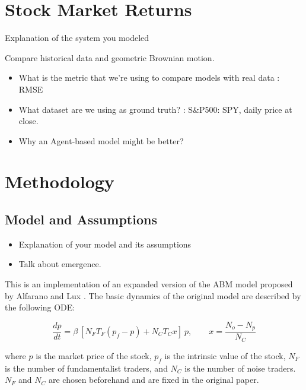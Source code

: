 \documentclass[11pt]{article}
\begin{document}
\section{Stock Market Returns}  %


Explanation of the system you modeled

Compare historical data and geometric Brownian motion.

\begin{itemize}
\item  What is the metric that we're using to compare models with real data : RMSE
\item What dataset are we using as ground truth? : S\&P500: SPY, daily price at close. 
\item Why an Agent-based model might be better?
\end{itemize}















\section{Methodology} 


\subsection{Model and Assumptions} %

\begin{itemize}
\item Explanation of your model and its assumptions
\item Talk about emergence. 
\end{itemize}

This is an implementation of an expanded version of the ABM model proposed by Alfarano and Lux \cite{lux}. The basic dynamics of the original model are described by the following ODE:

\begin{equation}
\frac{dp}{dt} = \beta \ [ N_F T_F (p_f - p) + N_C T_C x ] \ p, \qquad x = \frac{N_o - N_p}{N_C}
\end{equation}

\noindent where $p$ is the market price of the stock, $p_f$ is the intrinsic value of the stock, $N_F$ is the number of fundamentalist traders, and $N_C$ is the number of noise traders. $N_F$ and $N_C$ are chosen beforehand and are fixed in the original paper.
\end{document}
